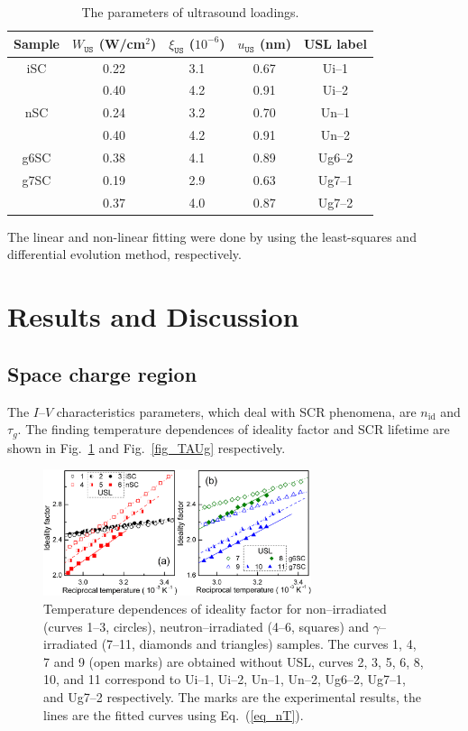 \documentclass[aip,jap, amsmath,amssymb,reprint]{revtex4-1}
\begin{document}
\begin{table}
\caption{\label{tabUSL}The parameters of ultrasound loadings.
}
\begin{ruledtabular}
\begin{tabular}{ccccc}
Sample&$W_{\mathtt{US}}$ (W/cm$^2$)&$\xi_{\mathtt{US}}$ ($10^{-6}$)&$u_{\mathtt{US}}$ (nm)&USL label\\
\hline
iSC&0.22&3.1&0.67&Ui--1\\
&0.40&4.2&0.91&Ui--2\\
nSC&0.24&3.2&0.70&Un--1\\
&0.40&4.2&0.91&Un--2\\
g6SC&0.38&4.1&0.89&Ug6--2\\
g7SC&0.19&2.9&0.63&Ug7--1\\
&0.37&4.0&0.87&Ug7--2\\
\end{tabular}
\end{ruledtabular}
\end{table}


The linear and non-linear fitting were done by using the least-squares and differential evolution \cite{DEWang} method, respectively.


\section{Results and Discussion}
\subsection{Space charge region\label{SCR}}
The $I$--$V$ characteristics parameters, which deal with SCR phenomena, are $n_{\mathrm{id}}$ and $\tau_{g}$.
The finding temperature dependences of ideality factor and SCR lifetime are shown in Fig.~\ref{fig_n} and Fig.~\ref{fig_TAUg} respectively.

\begin{figure}
\includegraphics[width=0.7\textwidth]{olikhFig2}%
\caption{\label{fig_n}
Temperature dependences of ideality factor for non--irradiated (curves 1--3, circles),
neutron--irradiated (4--6, squares) and $\gamma$--irradiated (7--11, diamonds and triangles) samples.
The curves 1, 4, 7 and 9 (open marks) are obtained without USL,
curves 2, 3, 5, 6, 8, 10, and 11 correspond to
Ui--1, Ui--2, Un--1, Un--2, Ug6--2, Ug7--1, and Ug7--2 respectively.
The marks are the experimental results, the lines are the fitted curves using Eq.~(\ref{eq_nT}).
}%
\end{figure}
\end{document}
